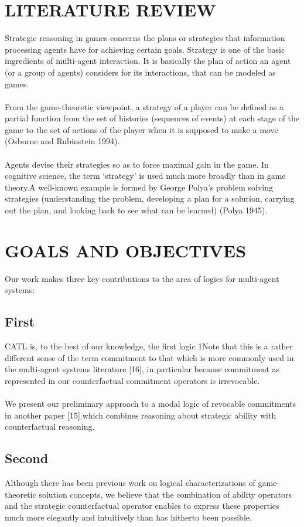 \documentclass[10pt,a4paper]{article}
\begin{document}
\section{ LITERATURE REVIEW }
Strategic reasoning in games concerns the plans or strategies that information processing
agents have for achieving certain goals. Strategy is one of the basic ingredients
of multi-agent interaction. It is basically the plan of action an agent (or a group
of agents) considers for its interactions, that can be modeled as games.\\\\ From the
game-theoretic viewpoint, a strategy of a player can be defined as a partial function
from the set of histories (sequences of events) at each stage of the game to the set of
actions of the player when it is supposed to make a move (Osborne and Rubinstein
1994).\\\\ Agents devise their strategies so as to force maximal gain in the game.
In cognitive science, the term ‘strategy’ is used much more broadly than in game
theory.A well-known example is formed by George Polya’s problem solving strategies
(understanding the problem, developing a plan for a solution, carrying out the plan, and
looking back to see what can be learned) (Polya 1945).

\section{GOALS AND OBJECTIVES}	
	Our work makes three key contributions to the area of logics for multi-agent systems:
	\subsection{First}
 CATL is, to the best of our knowledge, the first logic 1Note that this is a rather different sense of the term commitment to that which is more commonly used in the multi-agent systems literature [16], in particular because commitment as represented in our counterfactual commitment operators is irrevocable.\\\\ We present our preliminary approach to a modal logic of revocable commitments
 in another paper [15].which combines reasoning about strategic ability with counterfactual
 reasoning.
 
\subsection{Second}
Although there has been previous work on logical characterizations of game-theoretic solution concepts, we believe that the combination of ability operators and the strategic counterfactual operator enables to express these properties much more elegantly and intuitively than has hitherto been possible.
\end{document}
